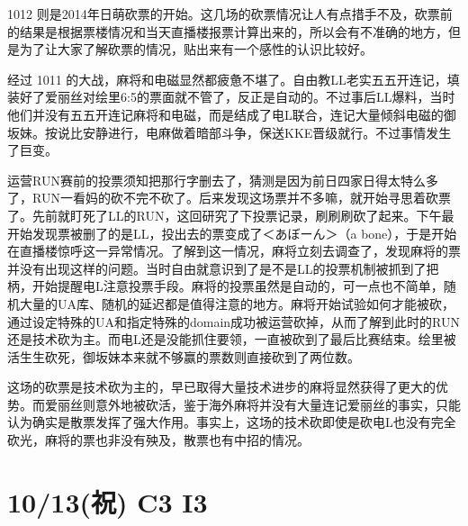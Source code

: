 1012 则是2014年日萌砍票的开始。这几场的砍票情况让人有点措手不及，砍票前的结果是根据票楼情况和当天直播楼报票计算出来的，所以会有不准确的地方，但是为了让大家了解砍票的情况，贴出来有一个感性的认识比较好。

经过 1011 的大战，麻将和电磁显然都疲惫不堪了。自由教LL老实五五开连记，填装好了爱丽丝对绘里6:5的票面就不管了，反正是自动的。不过事后LL爆料，当时他们并没有五五开连记麻将和电磁，而是结成了电L联合，连记大量倾斜电磁的御坂妹。按说比安静进行，电麻做着暗部斗争，保送KKE晋级就行。不过事情发生了巨变。

运营RUN赛前的投票须知把那行字删去了，猜测是因为前日四家日得太特么多了，RUN一看妈的砍不完不砍了。后来发现这场票并不多嘛，就开始寻思着砍票了。先前就盯死了LL的RUN，这回研究了下投票记录，刷刷刷砍了起来。下午最开始发现票被删了的是LL，投出去的票变成了{\mincho ＜あぼーん＞}（a bone），于是开始在直播楼惊呼这一异常情况。了解到这一情况，麻将立刻去调查了，发现麻将的票并没有出现这样的问题。当时自由就意识到了是不是LL的投票机制被抓到了把柄，开始提醒电L注意投票手段。麻将的投票虽然是自动的，可一点也不简单，随机大量的UA库、随机的延迟都是值得注意的地方。麻将开始试验如何才能被砍，通过设定特殊的UA和指定特殊的domain成功被运营砍掉，从而了解到此时的RUN还是技术砍为主。而电L还是没能抓住要领，一直被砍到了最后比赛结束。绘里被活生生砍死，御坂妹本来就不够赢的票数则直接砍到了两位数。

这场的砍票是技术砍为主的，早已取得大量技术进步的麻将显然获得了更大的优势。而爱丽丝则意外地被砍活，鉴于海外麻将并没有大量连记爱丽丝的事实，只能认为确实是散票发挥了强大作用。事实上，这场的技术砍即使是砍电L也没有完全砍光，麻将的票也非没有殃及，散票也有中招的情况。

\section{10/13(祝) C3 I3}


